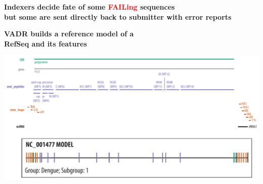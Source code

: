 \documentclass[landscape]{slides}
\begin{document}
\begin{slide}
\begin{center}
\textbf{Indexers decide fate of some \textcolor{red}{FAILing} sequences\\ but some are sent directly back to submitter with error reports}
\end{center}


\vfill
\end{slide}
\begin{slide}
\begin{center}
\large{\textbf{VADR builds a reference model of a \\ RefSeq and its features}}
\end{center}

\includegraphics[width=10.5in]{figs/dengue-features}

\vfill
\end{slide}
\end{document}
